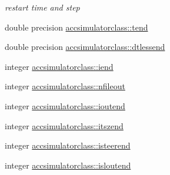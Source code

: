 \textbf{ }\par
{\em restart time and step }\begin{DoxyCompactItemize}
\item 
double precision \mbox{\hyperlink{namespaceaccsimulatorclass_a3621f5f3a672e424e33a20cc48e81c2c}{accsimulatorclass\+::tend}}
\item 
double precision \mbox{\hyperlink{namespaceaccsimulatorclass_a4717e8c2e59b129e66cf73a4fddbba50}{accsimulatorclass\+::dtlessend}}
\item 
integer \mbox{\hyperlink{namespaceaccsimulatorclass_aa5a33a2f7563789fd061ef4e28d010a5}{accsimulatorclass\+::iend}}
\item 
integer \mbox{\hyperlink{namespaceaccsimulatorclass_afbdd0b90129947de05fe38d3350ee006}{accsimulatorclass\+::nfileout}}
\item 
integer \mbox{\hyperlink{namespaceaccsimulatorclass_acf982b8b087c1b467ce8e8fc1f99d0a4}{accsimulatorclass\+::ioutend}}
\item 
integer \mbox{\hyperlink{namespaceaccsimulatorclass_a081922751fd50e67a7965e0fed6b56fb}{accsimulatorclass\+::itszend}}
\item 
integer \mbox{\hyperlink{namespaceaccsimulatorclass_a6fd9b5ae8cca8fa04bb8ba824b4a82f0}{accsimulatorclass\+::isteerend}}
\item 
integer \mbox{\hyperlink{namespaceaccsimulatorclass_a87e5ee2cf1ed3fb396f43f6996517831}{accsimulatorclass\+::isloutend}}
\end{DoxyCompactItemize}

